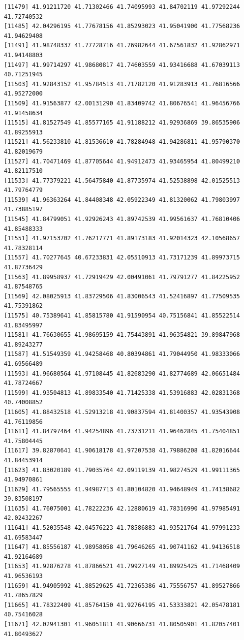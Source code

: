 \documentclass[
  letterpaper,
  DIV=11,
  numbers=noendperiod]{scrartcl}
\begin{document}
\begin{verbatim}
[11479] 41.91211720 41.71302466 41.74095993 41.84702119 41.97292244 41.72740532
[11485] 42.04296195 41.77678156 41.85293023 41.95041900 41.77568236 41.94629408
[11491] 41.98748337 41.77728716 41.76982644 41.67561832 41.92862971 41.94148803
[11497] 41.99714297 41.98680817 41.74603559 41.93416688 41.67039113 40.71251945
[11503] 41.92843152 41.95784513 41.71782120 41.91283913 41.76816566 41.95272000
[11509] 41.91563877 42.00131290 41.83409742 41.80676541 41.96456766 41.91458634
[11515] 41.81527549 41.85577165 41.91188212 41.92936869 39.86535906 41.89255913
[11521] 41.56233810 41.81536610 41.78284948 41.94286811 41.95790370 41.82019679
[11527] 41.70471469 41.87705644 41.94912473 41.93465954 41.80499210 41.82117510
[11533] 41.77379221 41.56475840 41.87735974 41.52538898 42.01525513 41.79764779
[11539] 41.96363264 41.84408348 42.05922349 41.81320062 41.79803997 41.73885197
[11545] 41.84799051 41.92926243 41.89742539 41.99561637 41.76810406 41.85488333
[11551] 41.97153702 41.76217771 41.89173183 41.92014323 42.10568657 41.78328114
[11557] 41.70277645 40.67233831 42.05510913 41.73171239 41.89973715 41.87736429
[11563] 41.89958937 41.72919429 42.00491061 41.79791277 41.84225952 41.87548765
[11569] 42.08025913 41.83729506 41.83006543 41.52416897 41.77509535 41.75391862
[11575] 40.75389641 41.85815780 41.91590954 40.75156841 41.85522514 41.83495997
[11581] 41.76630655 41.98695159 41.75443891 41.96354821 39.89847968 41.89243277
[11587] 41.51549359 41.94258468 40.80394861 41.79044950 41.98333066 41.69566489
[11593] 41.96680564 41.97108445 41.82683290 41.82774689 42.06651484 41.78724667
[11599] 41.93504813 41.89833540 41.71425338 41.53916883 42.02831368 40.74008852
[11605] 41.88432518 41.52913218 41.90837594 41.81400357 41.93543908 41.76119856
[11611] 41.84797464 41.94254896 41.73731211 41.96462845 41.75404851 41.75804445
[11617] 39.82870641 41.90618178 41.97207538 41.79886208 41.82016644 41.84453914
[11623] 41.83020189 41.79035764 42.09119139 41.98274529 41.99111365 41.94970861
[11629] 41.79565555 41.94987713 41.80104820 41.94648949 41.74138682 39.83508197
[11635] 41.76075001 41.78222236 42.12880619 41.78316990 41.97985491 42.02432267
[11641] 41.52035548 42.04576223 41.78586883 41.93521764 41.97991233 41.69583447
[11647] 41.85556187 41.98958058 41.79646265 41.90741162 41.94136518 41.92164689
[11653] 41.92876278 41.87866521 41.79927149 41.89925425 41.71468409 41.96536193
[11659] 41.94905992 41.88529625 41.72365386 41.75556757 41.89527866 41.78657829
[11665] 41.78322409 41.85764150 41.92764195 41.53333821 42.05478181 40.75416028
[11671] 42.02941301 41.96051811 41.90666731 41.80505901 41.82057401 41.80493627

\end{verbatim}
\end{document}
